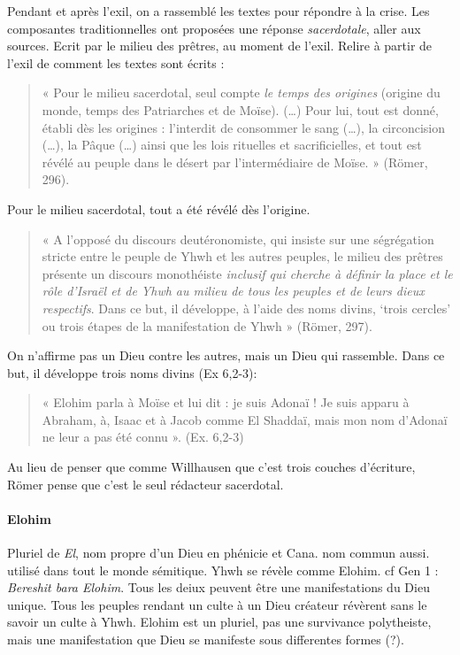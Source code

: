 Pendant et après l'exil, on a rassemblé les textes pour répondre à la crise. Les composantes traditionnelles ont proposées une réponse \textit{sacerdotale}, aller aux sources. Ecrit par le milieu des prêtres, au moment de l'exil. Relire à partir de l'exil de comment les textes sont écrits : 

\begin{quote}
« Pour le milieu sacerdotal, seul compte \textit{le temps des origines} (origine
du monde, temps des Patriarches et de Moïse). (\ldots) Pour lui, tout
est donné, établi dès les origines : l'interdit de consommer le sang
(\ldots), la circoncision (\ldots), la Pâque (\ldots) ainsi que les lois
rituelles et sacrificielles, et tout est révélé au peuple dans le désert
par l'intermédiaire de Moïse. » (Römer, 296).
\end{quote}

Pour le milieu sacerdotal, tout a été révélé dès l'origine. 


\begin{quote}
« A l'opposé du discours deutéronomiste, qui insiste sur une ségrégation
stricte entre le peuple de Yhwh et les autres peuples, {le
milieu des prêtres présente un discours monothéiste} \textit{inclusif
qui cherche à définir la place et le rôle d'Israël et de Yhwh au milieu
de tous les peuples et de leurs dieux respectifs}. Dans ce
but, il développe, à l'aide des noms divins, `trois cercles' ou trois
étapes de la manifestation de Yhwh » (Römer, 297).
\end{quote}
 
 On n'affirme pas un Dieu contre les autres, mais un Dieu qui rassemble. Dans ce but, il développe trois noms divins (Ex 6,2-3):
 
 \begin{quote}
     « Elohim parla à Moïse et lui dit : je suis Adonaï ! Je suis apparu à Abraham, à, Isaac et à Jacob comme El Shaddaï, mais mon nom d’Adonaï ne leur a pas été connu ». (Ex. 6,2-3) 
 \end{quote}

Au lieu de penser que comme Willhausen que c'est trois couches d'écriture, Römer pense que c'est le seul rédacteur sacerdotal.

      \paragraph{Elohim} Pluriel de \textit{El}, nom propre d'un Dieu en phénicie et Cana. nom commun aussi. utilisé dans tout le monde sémitique. Yhwh se révèle comme Elohim. cf Gen 1 : \emph{Bereshit bara Elohim}. Tous les deiux peuvent être une manifestations du Dieu unique. Tous les peuples rendant un culte à un Dieu créateur révèrent sans le savoir un culte à Yhwh.
      Elohim est un pluriel, pas une survivance polytheiste, mais une manifestation que Dieu se manifeste sous differentes formes (?).
      
